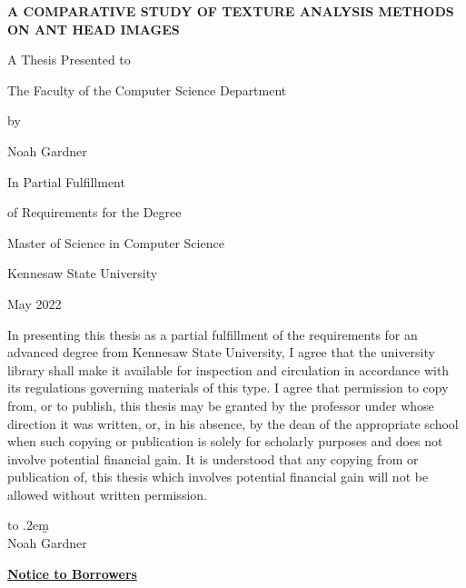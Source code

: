 \documentclass[12pt]{article}
\newcommand{\thesistitle}{
    {\Large A comparative study of texture analysis methods on
ant head images}
}
\begin{document}
\begin{center}
    \textbf{\MakeUppercase{\thesistitle}}
    \vspace{1in}

    A Thesis Presented to

    The Faculty of the Computer Science Department
    \vspace{1in}

    by
    \vspace{0.5in}

    Noah Gardner
    \vspace{1in}

    In Partial Fulfillment

    of Requirements for the Degree

    Master of Science in Computer Science

    \vspace{1in}
    Kennesaw State University

    May 2022
\end{center}
\thispagestyle{empty}
\newpage

\noindent In presenting this thesis as a partial fulfillment of the requirements
for an advanced degree from Kennesaw State University, I agree that the
university library shall make it available for inspection and circulation in
accordance with its regulations governing materials of this type. I agree that
permission to copy from, or to publish, this thesis may be granted by the
professor under whose direction it was written, or, in his absence, by the dean
of the appropriate school when such copying or publication is solely for
scholarly purposes and does not involve potential financial gain. It is
understood that any copying from or publication of, this thesis which involves
potential financial gain will not be allowed without written permission.
\vspace{2in}

\def\dotsign{\xleaders\hbox to .2em{\d{}}\hfill\d{}}
\begin{center}
    \makebox[.5\linewidth][r]\dotsign\smallskip\\
    Noah Gardner
\end{center}
\newpage

\begin{center}
    \textbf{\underline{Notice to Borrowers}}
\end{center}
\vspace{0.5in}
\end{document}

